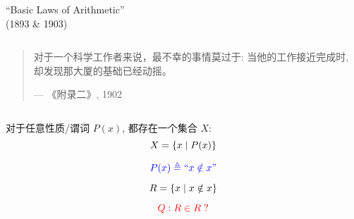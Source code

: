 
\begin{frame}{}
  \begin{columns}
      \begin{center}
        {``Basic Laws of Arithmetic'' \\ (1893 \& 1903)}
      \end{center}
  \end{columns}

  \pause
  \vspace{0.80cm}
  \begin{quote}
    对于一个科学工作者来说，最不幸的事情莫过于:
    当他的工作接近完成时, 却发现那大厦的基础已经动摇。

    \hfill --- 《附录二》, 1902
  \end{quote}
\end{frame}


\begin{frame}{}

  \begin{columns}
    \pause
    \pause
    \pause
  \end{columns}
\end{frame}

\begin{frame}{}
  \begin{theorem}[概括原则]
    对于任意性质/谓词 $P(x)$, 都存在一个集合 $X$:
    \[
      X = \{x \mid P(x)\}
    \]
  \end{theorem}

  \pause
  \begin{definition}
    \[
      \textcolor{blue}{P(x) \triangleq ``x \notin x"}
    \]

    \pause
    \[
      R = \{x \mid x \notin x\}
    \]

    \pause
    \[
      \textcolor{red}{Q: R \in R\;?}
    \]
  \end{definition}
\end{frame}

